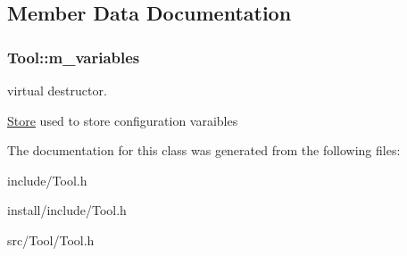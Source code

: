 \subsection{Member Data Documentation}
\hypertarget{classTool_a208aed50c1c50212d2927b372c38763f}{
\subsubsection[{m\-\_\-variables}]{ Tool\-::m\-\_\-variables\hspace{0.3cm}{\ttfamily [protected]}}}\label{classTool_a208aed50c1c50212d2927b372c38763f}


virtual destructor. 

\hyperlink{classStore}{Store} used to store configuration varaibles 

The documentation for this class was generated from the following files\-:\begin{DoxyCompactItemize}
\item 
include/Tool.\-h\item 
install/include/Tool.\-h\item 
src/\-Tool/Tool.\-h\end{DoxyCompactItemize}
